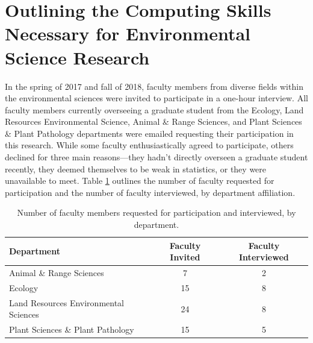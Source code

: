 \documentclass[12pt]{article}
\begin{document}
% 
% 

\section{Outlining the Computing Skills Necessary for Environmental Science Research}
\label{sec:faculty}

\quad In the spring of 2017 and fall of 2018, faculty members from diverse 
fields within the environmental sciences were invited to participate in a 
one-hour interview. All faculty members currently overseeing a graduate student
from the Ecology, Land Resources Environmental Science, Animal \& Range 
Sciences, and Plant Sciences \& Plant Pathology departments were emailed 
requesting their participation in this research. While some faculty 
enthusiastically agreed to participate, others declined for three main 
reasons---they hadn't directly overseen a graduate student recently, they deemed
themselves to be weak in statistics, or they were unavailable to meet. Table 
\ref{tab:faculty} outlines the number of faculty requested for participation and
the number of faculty interviewed, by department affiliation. 

{
\begin{table}[h!]
\centering
\begin{tabular}{lcc}
\hline
Department & Faculty Invited & Faculty Interviewed  \\
\hline
Animal \& Range Sciences & 7 & 2 \\
Ecology & 15 & 8 \\
Land Resources Environmental Sciences & 24 & 8 \\
Plant Sciences \& Plant Pathology &  15 & 5 \\ 
\hline
\end{tabular}
\caption{Number of faculty members requested for participation and interviewed,
by department.}
\label{tab:faculty}
\end{table}
}
\end{document}
